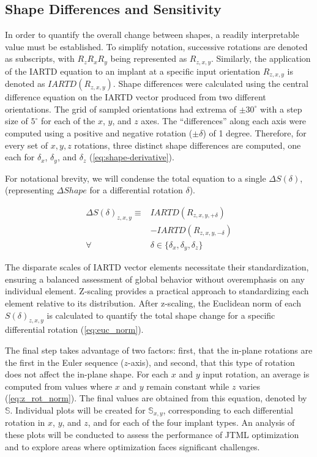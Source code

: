 \subsection{Shape Differences and Sensitivity}
In order to quantify the overall change between shapes, a readily interpretable value must be established.
To simplify notation, successive rotations are denoted as subscripts, with $R_{z}R_{x}R_{y}$ being represented as $R_{z,x,y}$. Similarly, the application of the IARTD equation to an implant at a specific input orientation $R_{z,x,y}$ is denoted as $IARTD(R_{z,x,y})$.
Shape differences were calculated using the central difference equation on the IARTD vector produced from two different orientations.
The grid of sampled orientations had extrema of $\pm 30^{\circ}$ with a step size of $5^{\circ}$ for each of the $x$, $y$, and $z$ axes.
The ``differences'' along each axis were computed using a positive and negative rotation ($\pm \delta $) of 1 degree.
Therefore, for every set of $x,y,z$ rotations, three distinct shape differences are computed, one each for $\delta_{x}$, $\delta_{y}$, and $\delta_{z}$ (\cref{eq:shape-derivative}).

For notational brevity, we will condense the total equation to a single $\Delta S(\delta)$, (representing $\Delta Shape$ for a differential rotation $\delta$).

\begin{equation}
	\label{eq:shape-derivative}
	\begin{split}
		\Delta S(\delta)_{z,x,y}  \equiv & IARTD(R_{z,x,y,+\delta})                        \\
		                                 & - IARTD(R_{z,x,y,-\delta})                      \\
		\forall                          & \delta \in \{\delta_{x},\delta_{y},\delta_{z}\}
	\end{split}
\end{equation}


The disparate scales of IARTD vector elements necessitate their standardization, ensuring a balanced assessment of global behavior without overemphasis on any individual element.
Z-scaling provides a practical approach to standardizing each element relative to its distribution.
After z-scaling, the Euclidean norm of each $S(\delta)_{z,x,y}$ is calculated to quantify the total shape change for a specific differential rotation (\cref{eq:euc_norm}).

The final step takes advantage of two factors: first, that the in-plane rotations are the first in the Euler sequence ($z$-axis), and second, that this type of rotation does not affect the in-plane shape.
For each $x$ and $y$ input rotation, an average is computed from values where $x$ and $y$ remain constant while $z$ varies (\cref{eq:z_rot_norm}). The final values are obtained from this equation, denoted by $\mathbb{S}$.
Individual plots will be created for $\mathbb{S}_{x,y}$, corresponding to each differential rotation in $x$, $y$, and $z$, and for each of the four implant types.
An analysis of these plots will be conducted to assess the performance of JTML optimization and to explore areas where optimization faces significant challenges.


